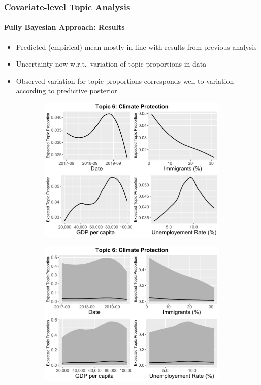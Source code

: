 \documentclass[xcolor=dvipsnames]{beamer}
\begin{document}
\begin{frame}
\frametitle{Covariate-level Topic Analysis}
\framesubtitle{Fully Bayesian Approach: Results}
\begin{itemize}
\item Predicted (empirical) mean mostly in line with results from previous analysis
\item Uncertainty now w.r.t.\ variation of topic proportions in data
\item Observed variation for topic proportions corresponds well to variation according to predictive posterior
\end{itemize}
\begin{figure}[h!]
  \centering
  \captionsetup{justification=centering}
  \begin{subfigure}[b]{0.4\linewidth}
    \includegraphics[width=\linewidth]{../plots/presentation/stanbeta_t6_without_credible.pdf}
  \end{subfigure}
  \begin{subfigure}[b]{0.4\linewidth}
    \includegraphics[width=\linewidth]{../plots/presentation/stanbeta_t6_with_credible.pdf}
  \end{subfigure}
\end{figure}
\end{frame}
\end{document}
